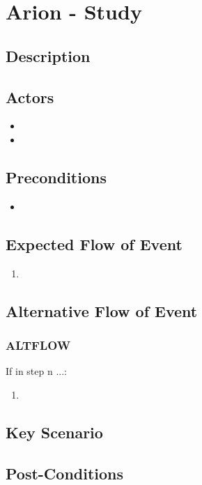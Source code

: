 \documentclass{scrreprt}
\begin{document}
\chapter*{Arion - Study}

\section*{Description}

\section*{Actors}
\begin{itemize}
    \item 
    \item 
\end{itemize}

\section*{Preconditions}
\begin{itemize}
    \item 
\end{itemize}

\section*{Expected Flow of Event}
\begin{enumerate}[1.]
    \item 
\end{enumerate}

\section*{Alternative Flow of Event}
\subsection*{ALTFLOW}
If in step n ...:
\begin{enumerate}
    \item 
\end{enumerate}

\section*{Key Scenario}

\section*{Post-Conditions}
\end{document}
